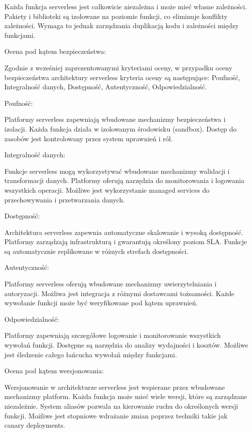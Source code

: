 \documentclass[runningheads,12pt]{llncs}
\begin{document}
Każda funkcja serverless jest całkowicie niezależna i może mieć własne zależności. Pakiety i biblioteki są izolowane na poziomie funkcji, co eliminuje konflikty zależności. Wymaga to jednak zarządzania duplikacją kodu i zależności między funkcjami. ~\cite[p. 156]{roberts2018cloud}

Ocena pod kątem bezpieczeństwa:

Zgodnie z wcześniej zaprezentowanymi kryteriami oceny, w przypadku oceny bezpieczeństwa architektury serverless kryteria oceny są następujące: Poufność, Integralność danych, Dostępność, Autentyczność, Odpowiedzialność.

Poufność: 

Platformy serverless zapewniają wbudowane mechanizmy bezpieczeństwa i izolacji. Każda funkcja działa w izolowanym środowisku (sandbox). Dostęp do zasobów jest kontrolowany przez system uprawnień i ról. ~\cite[p. 167]{roberts2018cloud}

Integralność danych: 

Funkcje serverless mogą wykorzystywać wbudowane mechanizmy walidacji i transformacji danych. Platformy oferują narzędzia do monitorowania i logowania wszystkich operacji. Możliwe jest wykorzystanie managed services do przechowywania i przetwarzania danych. ~\cite[p. 189]{roberts2018cloud}

Dostępność: 

Architektura serverless zapewnia automatyczne skalowanie i wysoką dostępność. Platformy zarządzają infrastrukturą i gwarantują określony poziom SLA. Funkcje są automatycznie replikowane w różnych strefach dostępności. ~\cite[p. 198]{roberts2018cloud}

Autentyczność: 

Platformy serverless oferują wbudowane mechanizmy uwierzytelniania i autoryzacji. Możliwa jest integracja z różnymi dostawcami tożsamości. Każde wywołanie funkcji może być weryfikowane pod kątem uprawnień. ~\cite[p. 223]{roberts2018cloud}

Odpowiedzialność: 

Platformy zapewniają szczegółowe logowanie i monitorowanie wszystkich wywołań funkcji. Dostępne są narzędzia do analizy wydajności i kosztów. Możliwe jest śledzenie całego łańcucha wywołań między funkcjami. ~\cite[p. 245]{roberts2018cloud}

Ocena pod kątem wersjonowania:

Wersjonowanie w architekturze serverless jest wspierane przez wbudowane mechanizmy platform. Każda funkcja może mieć wiele wersji, które są zarządzane niezależnie. System aliasów pozwala na kierowanie ruchu do określonych wersji funkcji. Możliwe jest stopniowe wdrażanie zmian poprzez techniki takie jak canary deployments. ~\cite[p. 267]{roberts2018cloud}
\end{document}
